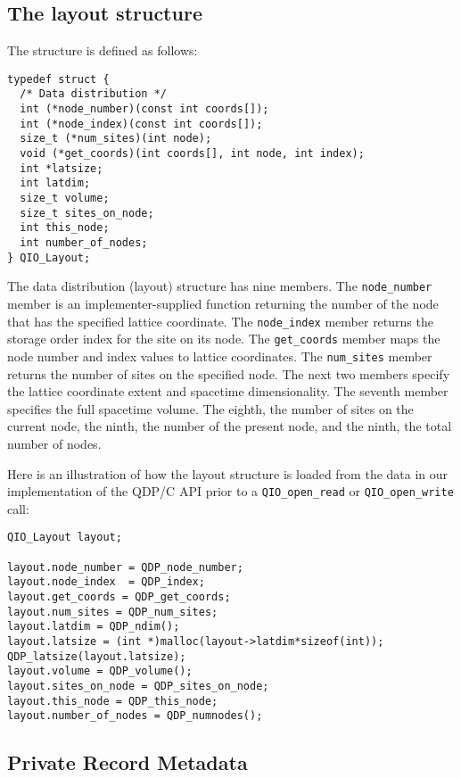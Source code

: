 \documentclass{article}
\begin{document}
\subsection{The layout structure}

The structure is defined as follows:
\begin{verbatim}
typedef struct {
  /* Data distribution */
  int (*node_number)(const int coords[]);
  int (*node_index)(const int coords[]);
  size_t (*num_sites)(int node);
  void (*get_coords)(int coords[], int node, int index);
  int *latsize;
  int latdim;
  size_t volume;
  size_t sites_on_node;
  int this_node;
  int number_of_nodes;
} QIO_Layout;
\end{verbatim}
%
The data distribution (layout) structure has nine members.  The
\verb|node_number| member is an implementer-supplied function
returning the number of the node that has the specified lattice
coordinate.  The \verb|node_index| member returns the storage order
index for the site on its node.  The \verb|get_coords| member maps the
node number and index values to lattice coordinates. The
\verb|num_sites| member returns the number of sites on the specified
node. The next two members specify the lattice coordinate extent and
spacetime dimensionality.  The seventh member specifies the full
spacetime volume.  The eighth, the number of sites on the current
node, the ninth, the number of the present node, and the ninth, the
total number of nodes.

Here is an illustration of how the layout structure is loaded from the
data in our implementation of the QDP/C API prior to a
\verb|QIO_open_read| or \verb|QIO_open_write| call:
%
\begin{verbatim}
QIO_Layout layout;

layout.node_number = QDP_node_number;
layout.node_index  = QDP_index;
layout.get_coords = QDP_get_coords;
layout.num_sites = QDP_num_sites;
layout.latdim = QDP_ndim();
layout.latsize = (int *)malloc(layout->latdim*sizeof(int));
QDP_latsize(layout.latsize);
layout.volume = QDP_volume();
layout.sites_on_node = QDP_sites_on_node;
layout.this_node = QDP_this_node;
layout.number_of_nodes = QDP_numnodes();
\end{verbatim}

\subsection{Private Record Metadata}
\label{sec:recordinfo}
\end{document}
